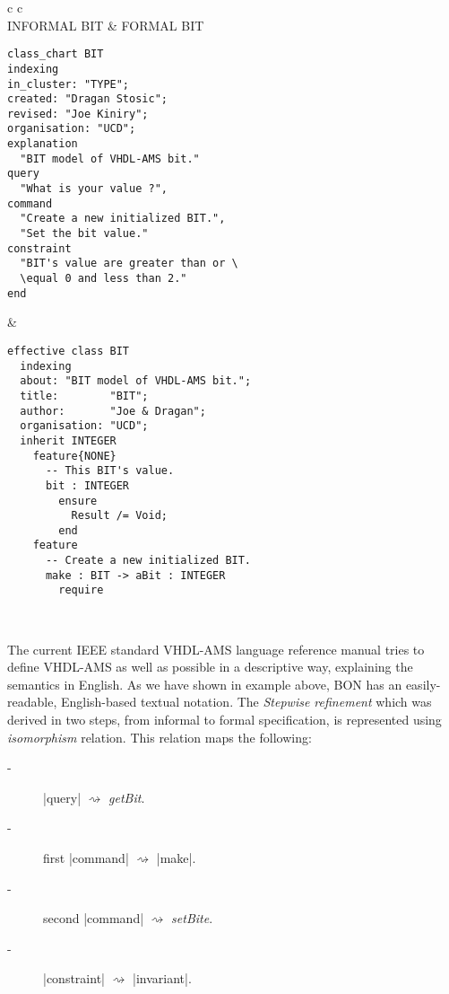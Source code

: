 \begin{center}
\begin{tabular}{ c  c }
\\ 
INFORMAL BIT & FORMAL BIT \\ 
\begin{minipage}[l]{6.4cm} 
\begin{lstlisting}[language=Bon]
class_chart BIT
indexing
in_cluster: "TYPE";
created: "Dragan Stosic";
revised: "Joe Kiniry";
organisation: "UCD";
explanation
  "BIT model of VHDL-AMS bit."
query
  "What is your value ?",
command
  "Create a new initialized BIT.",
  "Set the bit value."
constraint
  "BIT's value are greater than or \
  \equal 0 and less than 2."
end
\end{lstlisting}

\end{minipage}  
&
\begin{minipage}[l]{6.6cm}
\begin{lstlisting}[language=Bon]
effective class BIT
  indexing
  about: "BIT model of VHDL-AMS bit.";
  title:        "BIT";
  author:       "Joe & Dragan";
  organisation: "UCD"; 
  inherit INTEGER
    feature{NONE}
      -- This BIT's value.
      bit : INTEGER 
        ensure
          Result /= Void;
        end
    feature
      -- Create a new initialized BIT.
      make : BIT -> aBit : INTEGER
        require   
\end{lstlisting}
\end{minipage}\\
\begin{minipage}[l]{6.4cm} 
The current IEEE standard VHDL-AMS language reference manual 
tries to define VHDL-AMS as well as possible in a descriptive way, 
explaining the semantics in English. As we have shown in example above,
BON has an easily-readable, English-based textual notation.
The \emph{Stepwise refinement} which was derived in two steps, 
from informal to formal specification, 
is represented using \emph{isomorphism} relation. 
This relation maps the following:
\begin{description}
\item[-] \lstinlinenb|query| $\rightsquigarrow$ \emph{getBit}.
\item[-] first \lstinlinenb|command| $\rightsquigarrow$ \lstinlinenb|make|.
\item[-] second \lstinlinenb|command| $\rightsquigarrow$ \emph{setBite}.
\item[-] \lstinlinenb|constraint| $\rightsquigarrow$ \lstinlinenb|invariant|.

\end{description}
\end{minipage}
\end{tabular}
\end{center}
